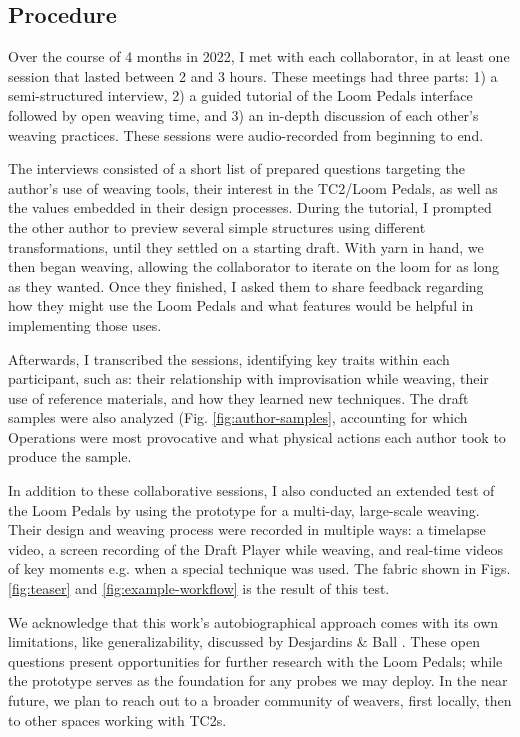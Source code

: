\subsection{Procedure}

Over the course of 4 months in 2022, I met with each collaborator, in at least one session that lasted between 2 and 3 hours. These meetings had three parts: 1) a semi-structured interview, 2) a guided tutorial of the Loom Pedals interface followed by open weaving time, and 3) an in-depth discussion of each other's weaving practices. These sessions were audio-recorded from beginning to end.

The interviews consisted of a short list of prepared questions targeting the author's use of weaving tools, their interest in the TC2/Loom Pedals, as well as the values embedded in their design processes. During the tutorial, I prompted the other author to preview several simple structures using different transformations, until they settled on a starting draft. With yarn in hand, we then began weaving, allowing the collaborator to iterate on the loom for as long as they wanted. Once they finished, I asked them to share feedback regarding how they might use the Loom Pedals and what features would be helpful in implementing those uses. 

Afterwards, I transcribed the sessions, identifying key traits within each participant, such as: their relationship with improvisation while weaving, their use of reference materials, and how they learned new techniques. The draft samples were also analyzed (Fig. \ref{fig:author-samples}, accounting for which Operations were most provocative and what physical actions each author took to produce the sample. 

In addition to these collaborative sessions, I also conducted an extended test of the Loom Pedals by using the prototype for a multi-day, large-scale weaving. Their design and weaving process were recorded in multiple ways: a timelapse video, a screen recording of the Draft Player while weaving, and real-time videos of key moments e.g. when a special technique was used. The fabric shown in Figs. \ref{fig:teaser} and \ref{fig:example-workflow} is the result of this test.

We acknowledge that this work's autobiographical approach comes with its own limitations, like generalizability, discussed by Desjardins \& Ball \cite{desjardins_revealing_2018}. These open questions present opportunities for further research with the Loom Pedals; while the prototype serves as the foundation for any probes we may deploy. In the near future, we plan to reach out to a broader community of weavers, first locally, then to other spaces working with TC2s.

